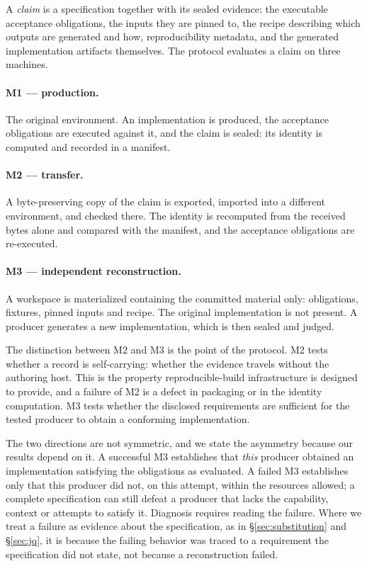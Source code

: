 \documentclass[10pt,twocolumn]{article}
\begin{document}
A \emph{claim} is a specification together with its sealed evidence: the
executable acceptance obligations, the inputs they are pinned to, the
recipe describing which outputs are generated and how, reproducibility
metadata, and the generated implementation artifacts themselves. The
protocol evaluates a claim on three machines.

\paragraph{M1 --- production.} The original environment. An
implementation is produced, the acceptance obligations are executed
against it, and the claim is sealed: its identity is computed and
recorded in a manifest.

\paragraph{M2 --- transfer.} A byte-preserving copy of the claim is
exported, imported into a different environment, and checked there. The
identity is recomputed from the received bytes alone and compared with
the manifest, and the acceptance obligations are re-executed.

\paragraph{M3 --- independent reconstruction.} A workspace is
materialized containing the committed material only: obligations,
fixtures, pinned inputs and recipe. The original implementation is not
present. A producer generates a new implementation, which is then sealed
and judged.

The distinction between M2 and M3 is the point of the protocol. M2 tests
whether a record is self-carrying: whether the evidence travels without
the authoring host. This is the property reproducible-build infrastructure
is designed to provide, and a failure of M2 is a defect in packaging or
in the identity computation. M3 tests whether the disclosed requirements
are sufficient for the tested producer to obtain a conforming
implementation.

The two directions are not symmetric, and we state the asymmetry because
our results depend on it. A successful M3 establishes that \emph{this}
producer obtained an implementation satisfying the obligations as
evaluated. A failed M3 establishes only that this producer did not, on
this attempt, within the resources allowed; a complete specification can
still defeat a producer that lacks the capability, context or attempts
to satisfy it. Diagnosis requires reading the failure. Where we treat a
failure as evidence about the specification, as in
\S\ref{sec:substitution} and \S\ref{sec:jq}, it is because the failing
behavior was traced to a requirement the specification did not state,
not because a reconstruction failed.
\end{document}
